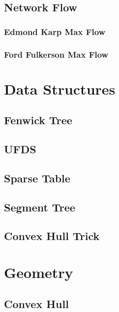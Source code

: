 \documentclass[twocolumn]{article}
\begin{document}
    \subsection{Network Flow}
        \subsubsection{Edmond Karp Max Flow}
        
        \subsubsection{Ford Fulkerson Max Flow}
        

    \newpage
    \section{Data Structures}
        \subsection{Fenwick Tree}
        
        \subsection{UFDS}
        
        \subsection{Sparse Table}
        
        \subsection{Segment Tree}
        
        \subsection{Convex Hull Trick}
        

    \newpage
    \section{Geometry}
        \subsection{Convex Hull}
        
\end{document}

